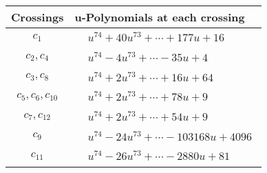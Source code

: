 \documentclass[1p]{elsarticle_modified}
\theoremstyle{definition}
\begin{document}
\begin{tabular}{m{50pt}|m{274pt}}
Crossings & \hspace{64pt}u-Polynomials at each crossing \\
\hline $$\begin{aligned}c_{1}\end{aligned}$$&$\begin{aligned}
&u^{74}+40 u^{73}+\cdots+177 u+16
\end{aligned}$\\
\hline $$\begin{aligned}c_{2},c_{4}\end{aligned}$$&$\begin{aligned}
&u^{74}-4 u^{73}+\cdots-35 u+4
\end{aligned}$\\
\hline $$\begin{aligned}c_{3},c_{8}\end{aligned}$$&$\begin{aligned}
&u^{74}+2 u^{73}+\cdots+16 u+64
\end{aligned}$\\
\hline $$\begin{aligned}c_{5},c_{6},c_{10}\end{aligned}$$&$\begin{aligned}
&u^{74}+2 u^{73}+\cdots+78 u+9
\end{aligned}$\\
\hline $$\begin{aligned}c_{7},c_{12}\end{aligned}$$&$\begin{aligned}
&u^{74}+2 u^{73}+\cdots+54 u+9
\end{aligned}$\\
\hline $$\begin{aligned}c_{9}\end{aligned}$$&$\begin{aligned}
&u^{74}-24 u^{73}+\cdots-103168 u+4096
\end{aligned}$\\
\hline $$\begin{aligned}c_{11}\end{aligned}$$&$\begin{aligned}
&u^{74}-26 u^{73}+\cdots-2880 u+81
\end{aligned}$\\
\hline
\end{tabular}\\~\\
\newpage\renewcommand{\arraystretch}{1}
\end{document}
